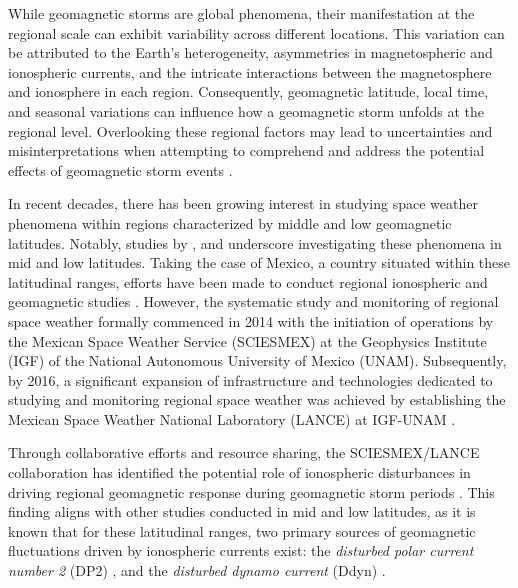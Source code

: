 \documentclass[a4paper,fleqn]{cas-dc}
\begin{document}
While geomagnetic storms are global phenomena, their manifestation at the regional scale can exhibit variability across different locations. This variation can be attributed to the Earth's heterogeneity, asymmetries in magnetospheric and ionospheric currents, and the intricate interactions between the magnetosphere and ionosphere in each region. Consequently, geomagnetic latitude, local time, and seasonal variations can influence how a geomagnetic storm unfolds at the regional level. Overlooking these regional factors may lead to uncertainties and misinterpretations when attempting to comprehend and address the potential effects of geomagnetic storm events \citep{gic_intro, gic, gic_2, gic_brazil}.

In recent decades, there has been growing interest in studying space weather phenomena within regions characterized by middle and low geomagnetic latitudes. Notably, studies by \cite{gic_czech, gic_brazil}, and \cite{gic} underscore investigating these phenomena in mid and low latitudes. Taking the case of Mexico, a country situated within these latitudinal ranges, efforts have been made to conduct regional ionospheric and geomagnetic studies \citep{MEXART2003, MEXART2005, MEXART_iono_dist, MEXART_iono_dist2, mario_rodriguez2011, lopez-montes, mario_rodriguez2014, iono-resp2016, lenica}. However, the systematic study and monitoring of regional space weather formally commenced in 2014 with the initiation of operations by the Mexican Space Weather Service (SCIESMEX) at the Geophysics Institute (IGF) of the National Autonomous University of Mexico (UNAM). Subsequently, by 2016, a significant expansion of infrastructure and technologies dedicated to studying and monitoring regional space weather was achieved by establishing the Mexican Space Weather National Laboratory (LANCE) at IGF-UNAM \citep{sciesmex_art}.

Through collaborative efforts and resource sharing, the SCIESMEX/LANCE collaboration has identified the potential role of ionospheric disturbances in driving regional geomagnetic response during geomagnetic storm periods \citep[see][]{esmeralda, dramaria_1, dramaria7, P-corona1, P-corona2}. This finding aligns with other studies conducted in mid and low latitudes, as it is known that for these latitudinal ranges, two primary sources of geomagnetic fluctuations driven by ionospheric currents exist: the \emph{disturbed polar current number 2} (DP2) \citep{nishida_68_coherence, nishida_68_fluctuations, nishida_66_knee}, and the \emph{disturbed dynamo current} (Ddyn) \citep{blanc_ddyn}.
\end{document}
